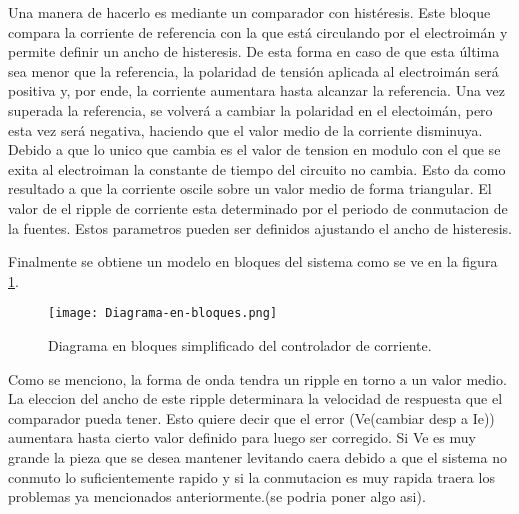 Una manera de hacerlo es mediante un comparador con histéresis. Este bloque compara la corriente de referencia con la que está circulando por el electroimán y permite definir un ancho de histeresis. De esta forma en caso de que esta última sea menor que la referencia, la polaridad de tensión aplicada al electroimán será positiva y, por ende, la corriente aumentara hasta alcanzar la referencia. Una vez superada la referencia, se volverá a cambiar la polaridad en el electoimán, pero esta vez será negativa, haciendo que el valor medio de la corriente disminuya. Debido a que lo unico que cambia es el valor de tension en modulo con el que se exita al electroiman la constante de tiempo del circuito no cambia. Esto da como resultado a que la corriente oscile sobre un valor medio de forma triangular. El valor de el ripple de corriente esta determinado por el periodo de conmutacion de la fuentes. Estos parametros pueden ser definidos ajustando el ancho de histeresis. 

Finalmente se obtiene un modelo en bloques del sistema como se ve en la figura \ref{fig:img_diag-en-bloques}.

\begin{figure}[H]
	\centering
	\texttt{[image: Diagrama-en-bloques.png]}
	\caption{Diagrama en bloques simplificado del controlador de corriente.}
	\label{fig:img_diag-en-bloques}
\end{figure}

Como se menciono, la forma de onda tendra un ripple en torno a un valor medio. La eleccion del ancho de este ripple determinara la velocidad de respuesta que el comparador pueda tener. Esto quiere decir que el error (Ve(cambiar desp a Ie)) aumentara hasta cierto valor definido para luego ser corregido. Si Ve es muy grande la pieza que se desea mantener levitando caera debido a que el sistema no conmuto lo suficientemente rapido y si la conmutacion es muy rapida traera los problemas ya mencionados anteriormente.(se podria poner algo asi).
